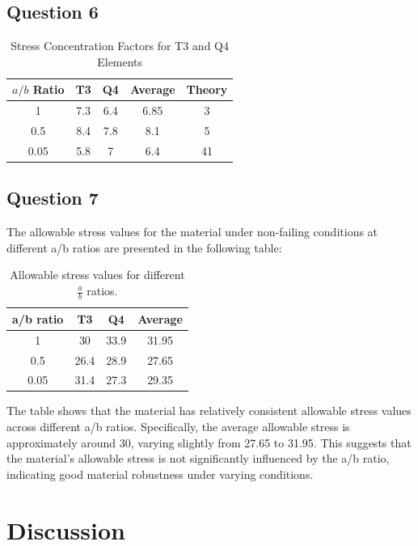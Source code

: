 \documentclass[twoside,twocolumn,10pt]{article}
\begin{document}
\subsection{Question 6}
\begin{table}[h]
  \centering
  \caption{Stress Concentration Factors for T3 and Q4 Elements}
  \begin{tabular}{|c|c|c|c|c|}
  \hline
  \(a/b\) Ratio & T3 & Q4 & Average & Theory \\
  \hline
  1 & 7.3 & 6.4 & 6.85 & 3 \\
  0.5 & 8.4 & 7.8 & 8.1 & 5 \\
  0.05 & 5.8 & 7 & 6.4 & 41 \\
  \hline
  \end{tabular}
  \label{tab:SCF}
\end{table}

\subsection{Question 7}

The allowable stress values for the material under non-failing conditions at different a/b ratios are presented in the following table:

\begin{table}[h]
\centering
\begin{tabular}{cccc}
\toprule
a/b  ratio & T3 & Q4 & Average \\
\midrule
1           & 30  & 33.9 & 31.95 \\
0.5         & 26.4& 28.9 & 27.65 \\
0.05        & 31.4& 27.3 & 29.35 \\
\bottomrule
\end{tabular}
\caption{Allowable stress values for different $\frac{a}{b}$  ratios.}
\end{table}


The table shows that the material has relatively consistent allowable stress values across different a/b ratios. Specifically, the average allowable stress is approximately around 30, varying slightly from 27.65 to 31.95. This suggests that the material's allowable stress is not significantly influenced by the a/b ratio, indicating good material robustness under varying conditions.



\section{Discussion}
\end{document}
